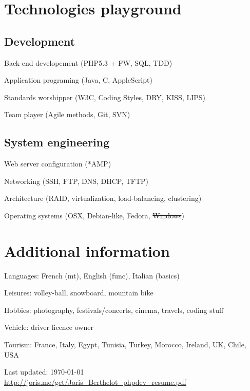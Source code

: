 \documentclass[letterpaper]{article}
\def\footerlink{http://joris.me/get/Joris\_Berthelot\_phpdev\_resume.pdf}
\renewenvironment{itemize}{
    \begin{list}{}{
        \setlength{\leftmargin}{1.5em}
    }
}{
    \end{list}
}
\begin{document}
    \section*{Technologies playground}
        
        \subsection*{Development}
            
            \begin{itemize}
                \item Back-end developement (PHP5.3 + FW, SQL, TDD)
                \item Application programing (Java, C, AppleScript)
                \item Standards worshipper (W3C, Coding Styles, DRY, KISS, LIPS)
                \item Team player (Agile methods, Git, SVN)
            \end{itemize}
            
        \subsection*{System engineering}
            
            \begin{itemize}
                \item Web server configuration (*AMP)
                \item Networking (SSH, FTP, DNS, DHCP, TFTP)
                \item Architecture (RAID, virtualization, load-balancing, clustering)
                \item Operating systems (OSX, Debian-like, Fedora, \sout{Windows})
            \end{itemize}
            
    \section*{Additional information}
        
        \begin{itemize}
            \item Languages: French (mt), English (func), Italian (basics)
            \item Leisures: volley-ball, snowboard, mountain bike
            \item Hobbies: photography, festivals/concerts, cinema, travels, coding stuff
            \item Vehicle: driver licence owner
            \item Tourism: France, Italy, Egypt, Tunisia, Turkey, Morocco, Ireland, UK, Chile, USA
        \end{itemize}
        
    \vfill
    
    \begin{center}
        \begin{footnotesize}
            Last updated: \today \\
            \href{\footerlink}{ \footerlink}
        \end{footnotesize}
    \end{center}
\end{document}
